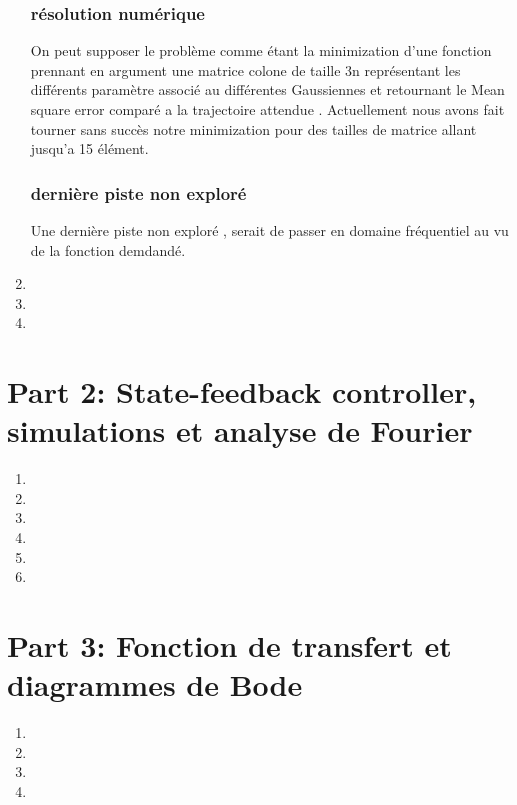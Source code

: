 \documentclass[a4paper, 11pt]{article}
\begin{document}
\begin{enumerate}
\subsubsection{résolution numérique}
On peut supposer le problème comme étant la minimization d'une fonction prennant en argument une matrice colone de taille 3n représentant les différents paramètre associé au différentes Gaussiennes et retournant le Mean square error comparé a la trajectoire attendue .
Actuellement nous avons fait tourner sans succès notre minimization pour des tailles de matrice allant jusqu'a 15 élément.
\subsubsection{dernière piste non exploré}
Une dernière piste non exploré , serait de passer en domaine fréquentiel au vu de la fonction demdandé.
    \item 
    
    \item 

    \item 
\end{enumerate}

\newpage
\section*{Part 2: State-feedback controller, simulations et analyse de Fourier}

\begin{enumerate}
    \item
    
    \item

    \item

    \item

    \item

    \item
\end{enumerate}

\newpage
\section*{Part 3: Fonction de transfert et diagrammes de Bode}
\begin{enumerate}
    \item

    \item

    \item

    \item
\end{enumerate}
\end{document}
